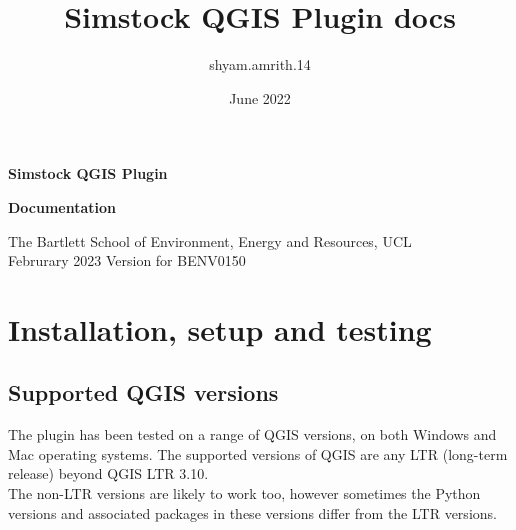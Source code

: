 \documentclass{article}
\title{Simstock QGIS Plugin docs}
\author{shyam.amrith.14 }
\date{June 2022}
\begin{document}
\begin{titlepage}
\begin{center}
\Huge
\textbf{Simstock QGIS Plugin}
\vspace{5mm}

\huge
\textbf{Documentation}

\vspace{1cm}
\large
The Bartlett School of Environment, Energy and Resources, UCL \\
\vspace{1mm}
Februrary 2023 Version for BENV0150
\end{center}
\vspace{1cm}
\tableofcontents
\end{titlepage}
\clearpage

\section{Installation, setup and testing}
\subsection{Supported QGIS versions}
The plugin has been tested on a range of QGIS versions, on both Windows and Mac operating systems. The supported versions of QGIS are any LTR (long-term release) beyond QGIS LTR 3.10. \\

The non-LTR versions are likely to work too, however sometimes the Python versions and associated packages in these versions differ from the LTR versions. %
\end{document}
